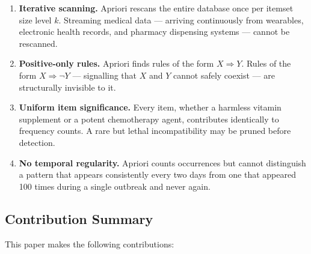 \documentclass[10pt,twocolumn]{article}
\theoremstyle{plain}
\theoremstyle{definition}
\theoremstyle{remark}
\begin{document}
\begin{enumerate}[label=\textbf{L\arabic*.}, leftmargin=*, itemsep=2pt]
  \item \textbf{Iterative scanning.} Apriori rescans the entire database
        once per itemset size level $k$. Streaming medical data — arriving
        continuously from wearables, electronic health records, and pharmacy
        dispensing systems — cannot be rescanned.

  \item \textbf{Positive-only rules.} Apriori finds rules of the form
        $X \Rightarrow Y$. Rules of the form $X \Rightarrow \lnot Y$ —
        signalling that $X$ and $Y$ cannot safely coexist — are
        structurally invisible to it.

  \item \textbf{Uniform item significance.} Every item, whether a
        harmless vitamin supplement or a potent chemotherapy agent,
        contributes identically to frequency counts.
        A rare but lethal incompatibility may be pruned before detection.

  \item \textbf{No temporal regularity.} Apriori counts occurrences
        but cannot distinguish a pattern that appears consistently every
        two days from one that appeared 100 times during a single outbreak
        and never again.
\end{enumerate}

\subsection{Contribution Summary}
\label{subsec:contributions}

This paper makes the following contributions:
\end{document}
